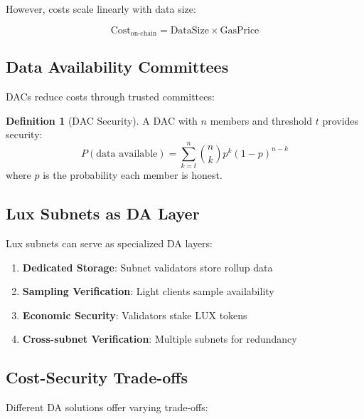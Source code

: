 \documentclass[11pt,a4paper]{article}
\theoremstyle{definition}
\newtheorem{definition}{Definition}[section]
\begin{document}
However, costs scale linearly with data size:

\begin{equation}
\text{Cost}_{\text{on-chain}} = \text{DataSize} \times \text{GasPrice}
\end{equation}

\subsection{Data Availability Committees}

DACs reduce costs through trusted committees:

\begin{definition}[DAC Security]
A DAC with $n$ members and threshold $t$ provides security:
\begin{equation}
P(\text{data available}) = \sum_{k=t}^{n} \binom{n}{k} p^k (1-p)^{n-k}
\end{equation}
where $p$ is the probability each member is honest.
\end{definition}

\subsection{Lux Subnets as DA Layer}

Lux subnets can serve as specialized DA layers:

\begin{enumerate}
    \item \textbf{Dedicated Storage}: Subnet validators store rollup data
    \item \textbf{Sampling Verification}: Light clients sample availability
    \item \textbf{Economic Security}: Validators stake LUX tokens
    \item \textbf{Cross-subnet Verification}: Multiple subnets for redundancy
\end{enumerate}

\subsection{Cost-Security Trade-offs}

Different DA solutions offer varying trade-offs:
\end{document}
